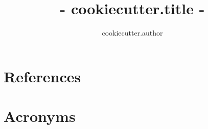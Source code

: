 \documentclass[{{ cookiecutter.lsstdoc_org }},toc]{lsstdoc}
\title{ {{- cookiecutter.title -}} }
\author{%
{{ cookiecutter.author }}
}
\date{\vcsDate}
\begin{document}
\maketitle


\appendix

\section{References} \label{sec:bib}
\renewcommand{\refname}{} %


\section{Acronyms} \label{sec:acronyms}

\end{document}
